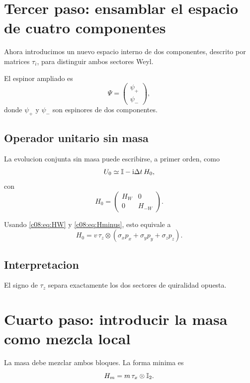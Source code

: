 \section{Tercer paso: ensamblar el espacio de cuatro componentes}
Ahora introducimos un nuevo espacio interno de dos componentes, descrito por matrices \(\tau_i\), para distinguir ambos sectores Weyl.

El espinor ampliado es
\begin{equation}
\Psi=
\begin{pmatrix}
\psi_+\\
\psi_-
\end{pmatrix},
\end{equation}
donde \(\psi_+\) y \(\psi_-\) son espinores de dos componentes.

\subsection{Operador unitario sin masa}
La evolucion conjunta sin masa puede escribirse, a primer orden, como
\begin{equation}
U_0 \simeq \mathbb{I} - \mathrm{i} \Delta t\,H_0,
\end{equation}
con
\begin{equation}
H_0=
\begin{pmatrix}
H_W & 0\\
0 & H_{-W}
\end{pmatrix}.
\label{c08:eq:H0block}
\end{equation}

Usando \eqref{c08:eq:HW} y \eqref{c08:eq:Hminus}, esto equivale a
\begin{equation}
H_0 = v\,\tau_z\otimes(\sigma_x p_x+\sigma_y p_y+\sigma_z p_z).
\label{c08:eq:H0tau}
\end{equation}

\subsection{Interpretacion}
El signo de \(\tau_z\) separa exactamente los dos sectores de quiralidad opuesta.

\section{Cuarto paso: introducir la masa como mezcla local}
La masa debe mezclar ambos bloques. La forma minima es
\begin{equation}
H_m = m\,\tau_x\otimes \mathbb{I}_2.
\label{c08:eq:Hm}
\end{equation}

